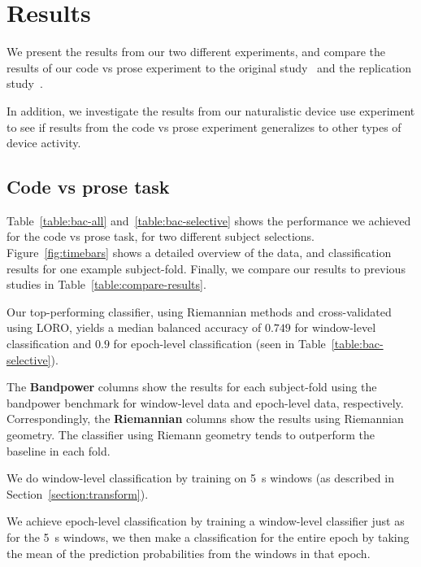 \chapter{Results}\label{section:results}

    We present the results from our two different experiments, and compare the results of our code vs prose experiment to the original study~\cite{floyd_decoding_2017} and the replication study~\cite{fucci_replication_2019}. 

    In addition, we investigate the results from our naturalistic device use experiment to see if results from the code vs prose experiment generalizes to other types of device activity.

    \vfill
    \pagebreak
    \section{Code vs prose task}
        Table~\ref{table:bac-all} and~\ref{table:bac-selective} shows the performance we achieved for the code vs prose task, for two different subject selections. Figure~\ref{fig:timebars} shows a detailed overview of the data, and classification results for one example subject-fold. Finally, we compare our results to previous studies in Table~\ref{table:compare-results}.

        

        Our top-performing classifier, using Riemannian methods and cross-validated using LORO, yields a median balanced accuracy of $0.749$  for window-level classification and $0.9$ for epoch-level classification (seen in Table~\ref{table:bac-selective}).

        The \textbf{Bandpower} columns show the results for each subject-fold using the bandpower benchmark for window-level data and epoch-level data, respectively. Correspondingly, the \textbf{Riemannian} columns show the results using Riemannian geometry. The classifier using Riemann geometry tends to outperform the baseline in each fold.

        We do window-level classification by training on \SI{5}{\second} windows (as described in Section~\ref{section:transform}).

        We achieve epoch-level classification by training a window-level classifier just as for the \SI{5}{\second} windows, we then make a classification for the entire epoch by taking the mean of the prediction probabilities from the windows in that epoch.

        

